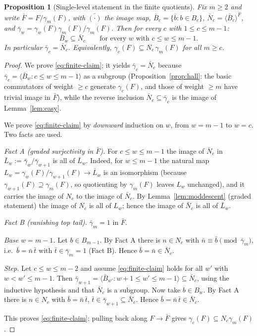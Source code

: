 \documentclass{amsart}
\newtheorem{proposition}{Proposition}
\theoremstyle{definition}
\theoremstyle{remark}
\begin{document}
\begin{proposition}[Single-level statement in the finite quotients]\label{prop:finiteS}
Fix $m\ge 2$ and write $\bar F=F/\gamma_m(F)$, with $\bar{(\cdot)}$ the image map,
$\bar B_c=\{\bar b:b\in B_c\}$, $\bar N_c=\langle\bar B_c\rangle^{\bar F}$, and
$\bar\gamma_w=\gamma_w(F)\gamma_m(F)/\gamma_m(F)$.
Then for every $c$ with $1\le c\le m-1$:
\begin{equation}\label{eq:finite-claim}
\bar B_w\subseteq\bar N_c\qquad\text{for every }w\text{ with }c\le w\le m-1 .
\end{equation}
In particular $\bar\gamma_c=\bar N_c$. Equivalently,
$\gamma_c(F)\subseteq N_c\,\gamma_m(F)$ for all $m\ge c$.
\end{proposition}
\begin{proof}
We prove \eqref{eq:finite-claim}; it yields $\bar\gamma_c=\bar N_c$ because
$\bar\gamma_c=\langle\bar B_w:c\le w\le m-1\rangle$ as a subgroup
(Proposition~\ref{prop:hall}: the basic commutators of weight $\ge c$ generate
$\gamma_c(F)$, and those of weight $\ge m$ have trivial image in $\bar F$), while the
reverse inclusion $\bar N_c\subseteq\bar\gamma_c$ is the image of
Lemma~\ref{lem:easy}.

We prove \eqref{eq:finite-claim} by \emph{downward} induction on $w$, from $w=m-1$
to $w=c$. Two facts are used.

\emph{Fact A (graded surjectivity in $\bar F$).} For $c\le w\le m-1$ the image of
$\bar N_c$ in $\bar L_w:=\bar\gamma_w/\bar\gamma_{w+1}$ is all of $\bar L_w$. Indeed,
for $w\le m-1$ the natural map $L_w=\gamma_w(F)/\gamma_{w+1}(F)\to\bar L_w$ is an
isomorphism (because $\gamma_{w+1}(F)\supseteq\gamma_m(F)$, so quotienting by
$\gamma_m(F)$ leaves $L_w$ unchanged), and it carries the image of $N_c$ to the image
of $\bar N_c$. By Lemma~\ref{lem:moddescent} (graded statement) the image of $N_c$ is
all of $L_w$; hence the image of $\bar N_c$ is all of $\bar L_w$.

\emph{Fact B (vanishing top tail).} $\bar\gamma_m=1$ in $\bar F$.

\emph{Base $w=m-1$.} Let $b\in B_{m-1}$. By Fact A there is
$n\in N_c$ with $\bar n\equiv\bar b\pmod{\bar\gamma_{m}}$, i.e.\
$\bar b=\bar n\,\bar t$ with $\bar t\in\bar\gamma_{m}=1$ (Fact B). Hence
$\bar b=\bar n\in\bar N_c$.

\emph{Step.} Let $c\le w\le m-2$ and assume \eqref{eq:finite-claim} holds for all
$w'$ with $w<w'\le m-1$. Then $\bar\gamma_{w+1}=\langle\bar B_{w'}:w+1\le w'\le
m-1\rangle\subseteq\bar N_c$, using the inductive hypothesis and that $\bar N_c$ is a
subgroup. Now take $b\in B_w$. By Fact A there is $n\in N_c$ with
$\bar b=\bar n\,\bar t$, $\bar t\in\bar\gamma_{w+1}\subseteq\bar N_c$. Hence
$\bar b=\bar n\,\bar t\in\bar N_c$.

This proves \eqref{eq:finite-claim}; pulling back along $F\to\bar F$ gives
$\gamma_c(F)\subseteq N_c\gamma_m(F)$.
\end{proof}
\end{document}
